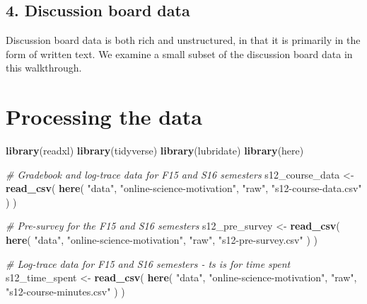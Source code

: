 \documentclass[]{book}
\newenvironment{Shaded}{\begin{snugshade}}{\end{snugshade}}
\newcommand{\KeywordTok}[1]{\textcolor[rgb]{0.13,0.29,0.53}{\textbf{#1}}}
\newcommand{\StringTok}[1]{\textcolor[rgb]{0.31,0.60,0.02}{#1}}
\newcommand{\CommentTok}[1]{\textcolor[rgb]{0.56,0.35,0.01}{\textit{#1}}}
\newcommand{\NormalTok}[1]{#1}
\begin{document}
\section{4. Discussion board data}\label{discussion-board-data}

Discussion board data is both rich and unstructured, in that it is
primarily in the form of written text. We examine a small subset of the
discussion board data in this walkthrough.

\chapter{Processing the data}\label{processing-the-data}

\begin{Shaded}
\begin{Highlighting}[]
\KeywordTok{library}\NormalTok{(readxl)}
\KeywordTok{library}\NormalTok{(tidyverse)}
\KeywordTok{library}\NormalTok{(lubridate)}
\KeywordTok{library}\NormalTok{(here)}
\end{Highlighting}
\end{Shaded}

\begin{Shaded}
\begin{Highlighting}[]
\CommentTok{# Gradebook and log-trace data for F15 and S16 semesters}
\NormalTok{s12_course_data <-}\StringTok{ }\KeywordTok{read_csv}\NormalTok{(}
  \KeywordTok{here}\NormalTok{(}
    \StringTok{"data"}\NormalTok{, }
    \StringTok{"online-science-motivation"}\NormalTok{, }
    \StringTok{"raw"}\NormalTok{, }
    \StringTok{"s12-course-data.csv"}
\NormalTok{  )}
\NormalTok{)}

\CommentTok{# Pre-survey for the F15 and S16 semesters}
\NormalTok{s12_pre_survey  <-}\StringTok{ }\KeywordTok{read_csv}\NormalTok{(}
  \KeywordTok{here}\NormalTok{(}
    \StringTok{"data"}\NormalTok{, }
    \StringTok{"online-science-motivation"}\NormalTok{, }
    \StringTok{"raw"}\NormalTok{, }
    \StringTok{"s12-pre-survey.csv"}
\NormalTok{  )}
\NormalTok{) }

\CommentTok{# Log-trace data for F15 and S16 semesters - ts is for time spent}
\NormalTok{s12_time_spent <-}\StringTok{ }\KeywordTok{read_csv}\NormalTok{(}
  \KeywordTok{here}\NormalTok{(}
    \StringTok{"data"}\NormalTok{, }
    \StringTok{"online-science-motivation"}\NormalTok{, }
    \StringTok{"raw"}\NormalTok{, }
    \StringTok{"s12-course-minutes.csv"}
\NormalTok{  )}
\NormalTok{)}
\end{Highlighting}
\end{Shaded}
\end{document}
